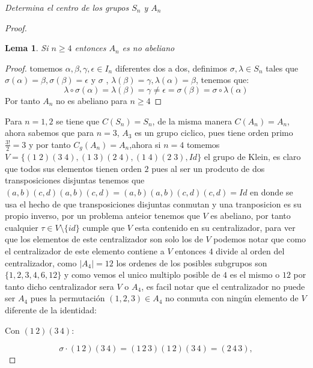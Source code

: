 \documentclass[11pt,letterpaper]{article}
\newtheorem*{lema}{Lema}
\begin{document}
\begin{tcolorbox}[
	title = \textcolor{black}{\textcolor{white}{Problema 10}},]
\textit{Determina el centro de los grupos $S_n$ y $A_n$
}
\end{tcolorbox}
\begin{proof}
    \begin{lema}
        Si $n\geq 4$ entonces $A_n$ es no abeliano
    \end{lema}
    \begin{proof}
        tomemos $\alpha,\beta,\gamma,\epsilon\in I_n$ diferentes dos a dos, definimos $\sigma,\lambda\in S_n$ tales que $\sigma(\alpha)=\beta,\sigma(\beta)=\epsilon$ y $\sigma $ , $\lambda(\beta)=\gamma,\lambda(\alpha)=\beta$, tenemos que:
        \begin{equation*}
            \lambda\circ\sigma(\alpha)=\lambda(\beta)=\gamma\neq\epsilon=\sigma(\beta)=\sigma\circ\lambda(\alpha)
        \end{equation*}
        Por tanto $A_n$ no es abeliano para $n\geq 4$
    \end{proof}
    Para $n=1,2$ se tiene que $C(S_n)=S_n$, de la misma manera $C(A_n)=A_n$, ahora sabemos que para $n=3$, $A_3$ es un grupo ciclico, pues tiene orden primo $\frac{3!}{2}=3$ y por tanto $C_g(A_n)=A_n$,ahora si $n=4$ tomemos $V=\{(1\;2)(3\;4),(1\;3)(2\;4),(1\;4)(2\;3),Id\}$ el grupo de Klein, es claro que todos sus elementos tienen orden $2$ pues al ser un prodcuto de dos transposiciones disjuntas tenemos que $(a,b)(c,d)(a,b)(c,d)=(a,b)(a,b)(c,d)(c,d)=Id$ en donde se usa el hecho de que transposiciones disjuntas conmutan y una tranposicion es su propio inverso, por un problema anteior tenemos que $V$ es abeliano, por tanto cualquier $\tau\in V\setminus\{id\}$ cumple que $V$ esta contenido en su centralizador, para ver que los elementos de este centralizador son solo los de $V$ podemos notar que como el centralizador de este elemento contiene a $V$ entonces $4$ divide al orden del centralizador, como $|A_4|=12$ los ordenes de los posibles subgrupos son $\{1,2,3,4,6,12\}$ y como vemos el unico multiplo posible de $4$ es el mismo o $12$ por tanto dicho centralizador sera $V$ o $A_4$, es facil notar que el centralizador no puede ser $A_4$ pues la permutaci\'on $(1,2,3)\in A_4$ no conmuta con ning\'un elemento de $V$ diferente de la identidad:\,\\
\item Con $(1\,2)(3\,4)$:


\[
\sigma \cdot (1\,2)(3\,4) = (1\,2\,3)(1\,2)(3\,4) = (2\,4\,3),
\]





\end{proof}
\end{document}
